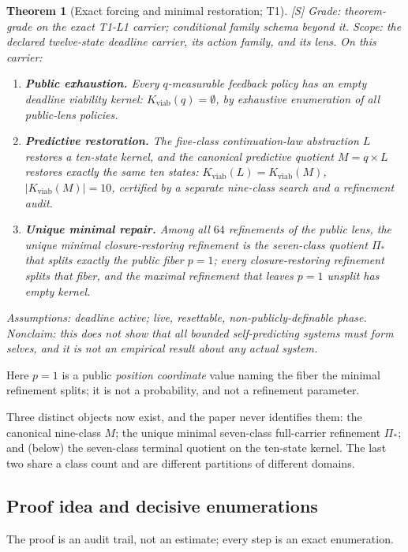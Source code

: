 \documentclass[11pt]{article}
\newcommand{\gradeS}{\textsf{[S]}}
\newcommand{\Kviab}{K_{\mathrm{viab}}}
\newtheorem{theorem}{Theorem}[section]
\theoremstyle{definition}
\begin{document}
\begin{theorem}[Exact forcing and minimal restoration; T1]
\label{thm:t1}
\gradeS{} \emph{Grade:} theorem-grade on the exact T1-L1 carrier; conditional
family schema beyond it. \emph{Scope:} the declared twelve-state deadline
carrier, its action family, and its lens. On this carrier:
\begin{enumerate}
\item \textbf{Public exhaustion.} Every $q$-measurable feedback policy has an
empty deadline viability kernel: $\Kviab(q) = \emptyset$, by exhaustive
enumeration of all public-lens policies.
\item \textbf{Predictive restoration.} The five-class continuation-law
abstraction $L$ restores a ten-state kernel, and the canonical predictive
quotient $M = q \times L$ restores exactly the same ten states:
$\Kviab(L) = \Kviab(M)$, $|\Kviab(M)| = 10$, certified by a separate
nine-class search and a refinement audit.
\item \textbf{Unique minimal repair.} Among all $64$ refinements of the
public lens, the unique minimal closure-restoring refinement is the
seven-class quotient $\Pi_*$ that splits exactly the public fiber $p=1$;
every closure-restoring refinement splits that fiber, and the maximal
refinement that leaves $p=1$ unsplit has empty kernel.
\end{enumerate}
\emph{Assumptions:} deadline active; live, resettable, non-publicly-definable
phase. \emph{Nonclaim:} this does not show that all bounded self-predicting
systems must form selves, and it is not an empirical result about any actual
system.
\end{theorem}

Here $p=1$ is a public \emph{position coordinate} value naming the fiber the
minimal refinement splits; it is not a probability, and not a refinement
parameter.

Three distinct objects now exist, and the paper never identifies them: the
canonical nine-class $M$; the unique minimal seven-class full-carrier
refinement $\Pi_*$; and (below) the seven-class terminal quotient on the
ten-state kernel. The last two share a class count and are different
partitions of different domains.

\subsection{Proof idea and decisive enumerations}

The proof is an audit trail, not an estimate; every step is an exact
enumeration.
\end{document}
